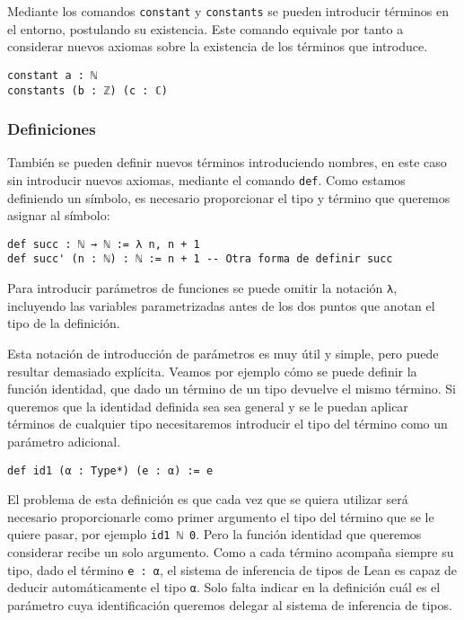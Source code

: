 Mediante los comandos \lstinline{constant} y \lstinline{constants} se
pueden introducir términos en el entorno, postulando su existencia. Este comando
equivale por tanto a considerar nuevos axiomas sobre la existencia de los
términos que introduce.
\begin{lstlisting}
constant a : ℕ
constants (b : ℤ) (c : ℂ)
\end{lstlisting}


\subsubsection*{Definiciones}%

También se pueden definir nuevos términos introduciendo nombres, en este caso
sin introducir nuevos axiomas, mediante el comando \lstinline{def}. Como estamos
definiendo un símbolo, es necesario proporcionar el tipo y término que queremos
asignar al símbolo:

\begin{lstlisting}
def succ : ℕ → ℕ := λ n, n + 1
def succ' (n : ℕ) : ℕ := n + 1 -- Otra forma de definir succ
\end{lstlisting}

Para introducir parámetros de funciones se puede omitir la notación
\lstinline{λ}, incluyendo las variables parametrizadas antes de los dos puntos
que anotan el tipo de la definición.

Esta notación de introducción de parámetros es muy útil y simple, pero puede
resultar demasiado explícita. Veamos por ejemplo cómo se puede definir la
función identidad, que dado un término de un tipo devuelve el mismo término.
Si queremos que la identidad definida sea sea general y se le puedan aplicar términos
de cualquier tipo necesitaremos introducir el tipo del término como un parámetro
adicional.

\begin{lstlisting}
def id1 (α : Type*) (e : α) := e
\end{lstlisting}

El problema de esta definición es que cada vez que se quiera utilizar será
necesario proporcionarle como primer argumento el tipo del término que se le
quiere pasar, por ejemplo \lstinline{id1 ℕ 0}.
Pero la función identidad que queremos considerar recibe un solo argumento.
Como a cada término acompaña siempre su tipo, dado el término \lstinline{e : α},
el sistema de inferencia de tipos de Lean es capaz de deducir automáticamente el
tipo \lstinline{α}. Solo falta indicar en la definición cuál es el parámetro
cuya identificación queremos delegar al sistema de inferencia de tipos.\\


